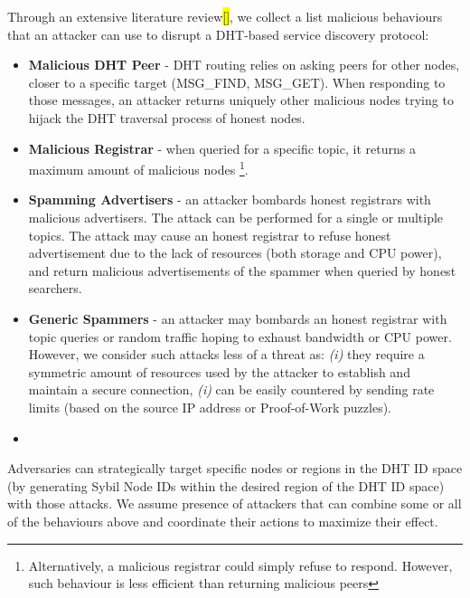 Through an extensive literature review\hl{[]}, we collect a list malicious behaviours that an attacker can use to disrupt a DHT-based service discovery protocol:
\begin{itemize}
    \item \textbf{Malicious DHT Peer} - DHT routing relies on asking peers for other nodes, closer to a specific target (\eg MSG\_FIND, MSG\_GET). When responding to those messages, an attacker returns uniquely other malicious nodes trying to hijack the DHT traversal process of honest nodes.
    \item \textbf{Malicious Registrar} - when queried for a specific topic, it returns a maximum amount of malicious nodes \footnote{Alternatively, a malicious registrar could simply refuse to respond. However, such behaviour is less efficient than returning malicious peers}. 
    \item \textbf{Spamming Advertisers} - an attacker bombards honest registrars with malicious advertisers. The attack can be performed for a single or multiple topics. The attack may cause an honest registrar to refuse honest advertisement due to the lack of resources (both storage and CPU power), and return malicious advertisements of the spammer when queried by honest searchers. 
    \item \textbf{Generic Spammers} - an attacker may bombards an honest registrar with topic queries or random traffic hoping to exhaust bandwidth or CPU power. However, we consider such attacks less of a threat as: \textit{(i)} they require a symmetric amount of resources used by the attacker to establish and maintain a secure connection, \textit{(i)} can be easily countered by sending rate limits (\eg based on the source IP address or Proof-of-Work puzzles). 
    \item {}
\end{itemize}

Adversaries can strategically target specific nodes or regions in the DHT ID space (\ie by generating Sybil Node IDs within the desired region of the DHT ID space) with those attacks. We assume presence of attackers that can combine some or all of the behaviours above and coordinate their actions to maximize their effect. 




